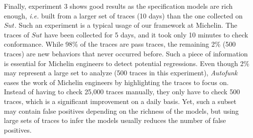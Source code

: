 Finally, experiment $3$ shows good results as the specification
models are rich enough, \emph{i.e.}  built from a larger set of
traces (10 days) than the one collected on $\mathit{Sut}$. Such
an experiment is a typical usage of our framework at Michelin.
The traces of $\mathit{Sut}$ have been collected for 5 days, and
it took only 10 minutes to check conformance. While 98\% of the
traces are pass traces, the remaining 2\% (500 traces) are
new behaviors that never occurred before. Such a piece of
information is essential for Michelin engineers to detect
potential regressions. Even though 2\% may represent a large set
to analyze (500 traces in this experiment),
\textit{Autofunk} eases the work of Michelin engineers by
highlighting the traces to focus on. Instead of having to check
25,000 traces manually, they only have to check 500 traces, which
is a significant improvement on a daily basis.
Yet, such a subset may contain false positives depending on the
richness of the models, but using large sets of traces to infer
the models usually reduces the number of false positives.
